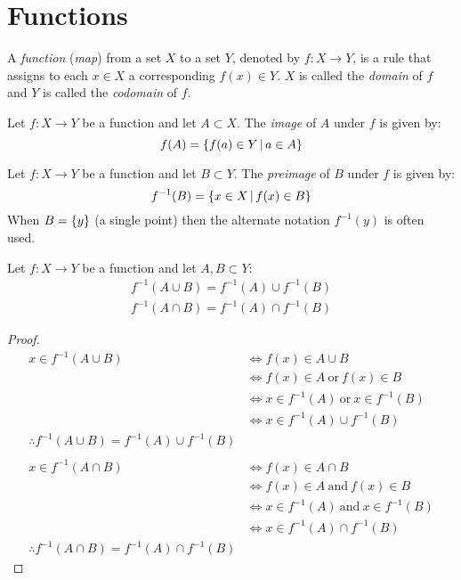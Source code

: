 \documentclass[letterpaper,12pt,fleqn]{article}
\begin{document}
\section*{Functions}

\begin{definition}[Function]
  A \emph{function} (\emph{map}) from a set \(X\) to a set \(Y\), denoted by \(f:X\to Y\), is a rule that assigns to
  each \(x\in X\) a corresponding \(f(x)\in Y\).  \(X\) is called the \emph{domain} of \(f\) and \(Y\) is called
  the \emph{codomain} of \(f\).
\end{definition}

\begin{definition}[Image]
  Let \(f:X\to Y\) be a function and let \(A\subset X\).  The \emph{image} of \(A\) under \(f\) is given by:
  \[f(A)=\left\{{f(a)\in Y}\,\middle|\,{a\in A}\right\}\]
\end{definition}

\begin{definition}[Preimage]
  Let \(f:X\to Y\) be a function and let \(B\subset Y\).  The \emph{preimage} of \(B\) under \(f\) is given by:
  \[f^{-1}(B)=\left\{{x\in X}\,\middle|\,{f(x)\in B}\right\}\]
  When \(B=\{y\}\) (a single point) then the alternate notation \(f^{-1}(y)\) is often used.
\end{definition}

\begin{theorem}
  Let \(f:X\to Y\) be a function and let \(A,B\subset Y\):
  \begin{gather*}
    f^{-1}(A\cup B)=f^{-1}(A)\cup f^{-1}(B) \\
    f^{-1}(A\cap B)=f^{-1}(A)\cap f^{-1}(B)
  \end{gather*}
\end{theorem}

\begin{proof}
  \begin{align*}
    x\in f^{-1}(A\cup B) &\iff f(x)\in A\cup B \\
    &\iff f(x)\in A\ \text{or}\ f(x)\in B \\
    &\iff x\in f^{-1}(A)\ \text{or}\ x\in f^{-1}(B) \\
    &\iff x\in f^{-1}(A)\cup f^{-1}(B) \\
    \therefore f^{-1}(A\cup B)=f^{-1}(A)\cup f^{-1}(B) \\
    \\
    x\in f^{-1}(A\cap B) &\iff f(x)\in A\cap B \\
    &\iff f(x)\in A\ \text{and}\ f(x)\in B \\
    &\iff x\in f^{-1}(A)\ \text{and}\ x\in f^{-1}(B) \\
    &\iff x\in f^{-1}(A)\cap f^{-1}(B) \\
    \therefore f^{-1}(A\cap B)=f^{-1}(A)\cap f^{-1}(B)
  \end{align*}
\end{proof}
\end{document}
